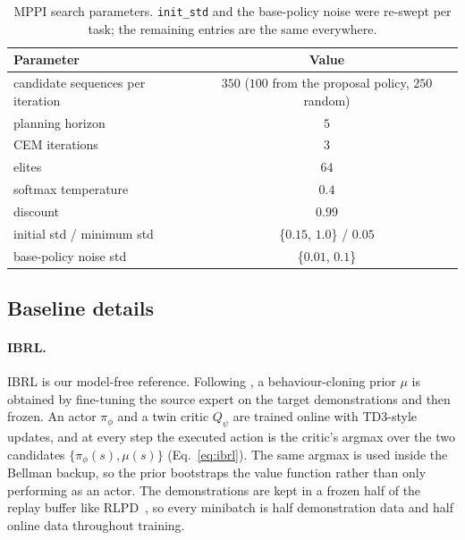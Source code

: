 \documentclass{article} %
\begin{document}
\begin{table}[h]
\centering
\caption{MPPI search parameters. \texttt{init\_std} and the base-policy noise
were re-swept per task; the remaining entries are the same everywhere.}
\label{tab:app-planner}
\small
\begin{tabular}{lc}
\toprule
Parameter & Value \\
\midrule
candidate sequences per iteration & $350$ ($100$ from the proposal policy, $250$ random) \\
planning horizon & $5$ \\
CEM iterations & $3$ \\
elites & $64$ \\
softmax temperature & $0.4$ \\
discount & $0.99$ \\
initial std / minimum std & \{$0.15$, $1.0$\} / $0.05$ \\
base-policy noise std & \{$0.01$, $0.1$\} \\
\bottomrule
\end{tabular}
\end{table}

\subsection{Baseline details}
\label{app:baselines}

\paragraph{IBRL.}
IBRL is our model-free reference. Following \citet{hu2023imitation}, a behaviour-cloning prior $\mu$ is obtained by fine-tuning the source expert on the target demonstrations and then frozen. An actor $\pi_\phi$ and a twin critic $Q_\psi$ are trained online with TD3-style updates, and at every step the executed action is the critic's argmax over the two candidates $\{\pi_\phi(s), \mu(s)\}$ (Eq.~\ref{eq:ibrl}). The same argmax is used inside the Bellman backup, so the prior bootstraps the value function rather than only performing as an actor. The demonstrations are kept in a frozen half of the replay buffer like RLPD~\citep{ball2023efficient}, so every minibatch is half demonstration data and half online data throughout training.
\end{document}
